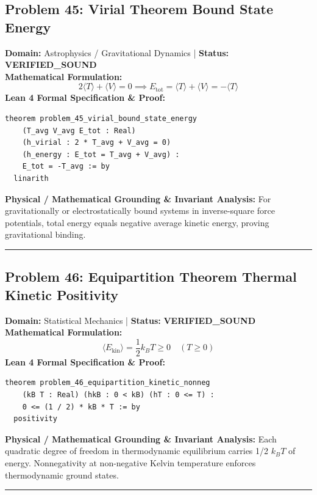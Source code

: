 \documentclass[10pt,a4paper]{article}
\begin{document}
\subsection*{Problem 45: Virial Theorem Bound State Energy}
\textbf{Domain:} Astrophysics / Gravitational Dynamics \quad | \quad \textbf{Status:} \textcolor{green!70!black}{\textbf{VERIFIED\_SOUND}}\\
\textbf{Mathematical Formulation:}
\begin{equation*}
  2\langle T \rangle + \langle V \rangle = 0 \implies E_{\text{tot}} = \langle T \rangle + \langle V \rangle = -\langle T \rangle
\end{equation*}
\textbf{Lean 4 Formal Specification \& Proof:}
\begin{lstlisting}
theorem problem_45_virial_bound_state_energy
    (T_avg V_avg E_tot : Real)
    (h_virial : 2 * T_avg + V_avg = 0)
    (h_energy : E_tot = T_avg + V_avg) :
    E_tot = -T_avg := by
  linarith
\end{lstlisting}
\textbf{Physical / Mathematical Grounding \& Invariant Analysis:}
For gravitationally or electrostatically bound systems in inverse-square force potentials, total energy equals negative average kinetic energy, proving gravitational binding.
\vspace{0.8em}\hrule\vspace{0.8em}
\subsection*{Problem 46: Equipartition Theorem Thermal Kinetic Positivity}
\textbf{Domain:} Statistical Mechanics \quad | \quad \textbf{Status:} \textcolor{green!70!black}{\textbf{VERIFIED\_SOUND}}\\
\textbf{Mathematical Formulation:}
\begin{equation*}
  \langle E_{\text{kin}} \rangle = \frac{1}{2} k_B T \ge 0 \quad (T \ge 0)
\end{equation*}
\textbf{Lean 4 Formal Specification \& Proof:}
\begin{lstlisting}
theorem problem_46_equipartition_kinetic_nonneg
    (kB T : Real) (hkB : 0 < kB) (hT : 0 <= T) :
    0 <= (1 / 2) * kB * T := by
  positivity
\end{lstlisting}
\textbf{Physical / Mathematical Grounding \& Invariant Analysis:}
Each quadratic degree of freedom in thermodynamic equilibrium carries 1/2 $k_B T$ of energy. Nonnegativity at non-negative Kelvin temperature enforces thermodynamic ground states.
\vspace{0.8em}\hrule\vspace{0.8em}
\end{document}
